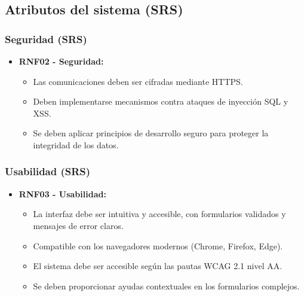 \subsection{Atributos del sistema (SRS)}
\label{srs:atributos}

\subsubsection{Seguridad (SRS)}
\begin{itemize}
\item \textbf{RNF02 - Seguridad:}
  \begin{itemize}
  \item Las comunicaciones deben ser cifradas mediante HTTPS.
  \item Deben implementarse mecanismos contra ataques de inyección SQL y XSS.
  \item Se deben aplicar principios de desarrollo seguro para proteger la integridad de los datos.
  \end{itemize}
\end{itemize}

\subsubsection{Usabilidad (SRS)}
\begin{itemize}
\item \textbf{RNF03 - Usabilidad:}
  \begin{itemize}
  \item La interfaz debe ser intuitiva y accesible, con formularios validados y mensajes de error claros.
  \item Compatible con los navegadores modernos (Chrome, Firefox, Edge).
  \item El sistema debe ser accesible según las pautas WCAG 2.1 nivel AA.
  \item Se deben proporcionar ayudas contextuales en los formularios complejos.
  \end{itemize}
\end{itemize}

